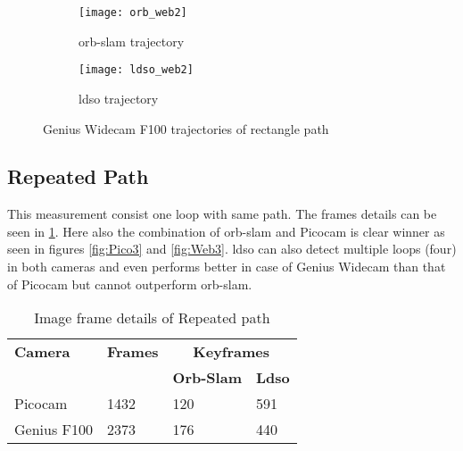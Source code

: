 \begin{figure}[H]
	\begin{subfigure}{.6\textwidth}
		\centering
		\texttt{[image: orb\_web2]}
		\caption{\acrshort{orb}-\acrshort{slam} trajectory}
		\label{fig:orb_web2}
	\end{subfigure}%
	\begin{subfigure}{.5\textwidth}
		\centering
		\texttt{[image: ldso\_web2]}
		\caption{\acrshort{ldso} trajectory}
		\label{fig:ldso_web2}
	\end{subfigure}
	\caption{Genius Widecam F100 trajectories of rectangle path}
	\label{fig:Web2}
\end{figure}

\subsection{Repeated Path}
This measurement consist one loop with same path. The frames details can be seen in \ref{table:repeated}. Here also the combination of \acrshort{orb}-\acrshort{slam} and Picocam is clear winner as seen in figures \ref{fig:Pico3} and \ref{fig:Web3}. \acrshort{ldso} can also detect multiple loops (four) in both cameras and even performs better in case of Genius Widecam than that of Picocam but cannot outperform \acrshort{orb}-\acrshort{slam}.  
\begin{table}[H]
	\centering
	\renewcommand{\arraystretch}{1.5}
	\begin{tabular}{ l| l| l |l }
		\textbf{Camera} & \textbf{Frames} & \multicolumn{2}{c}{\textbf{Keyframes}}  \\    
		&      & \textbf{Orb-Slam}  & \textbf{Ldso}  \\
		\hline
		Picocam & 1432 &  120  & 591 \\ 
		\hline
		Genius F100 & 2373 &  176  & 440 \\ 
	\end{tabular}
	\caption{Image frame details of Repeated path}
	\label{table:repeated}
\end{table}

